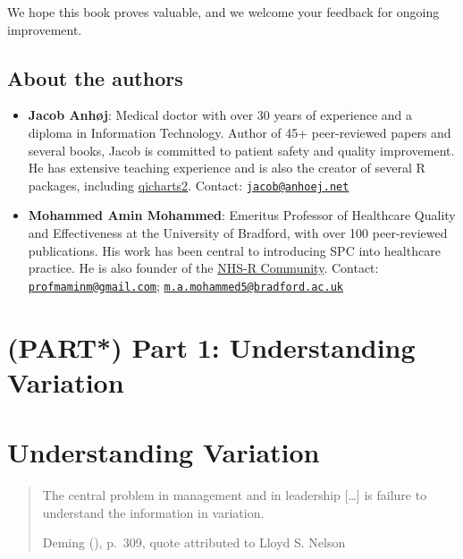 \documentclass[
]{book}
\begin{document}
We hope this book proves valuable, and we welcome your feedback for
ongoing improvement.

\section*{About the authors}\label{about-the-authors}

\begin{itemize}
\item
  \textbf{Jacob Anhøj}: Medical doctor with over 30 years of experience
  and a diploma in Information Technology. Author of 45+ peer-reviewed
  papers and several books, Jacob is committed to patient safety and
  quality improvement. He has extensive teaching experience and is also
  the creator of several R packages, including
  \href{https://anhoej.github.io/qicharts2/}{qicharts2}. Contact:
  \href{mailto:jacob@anhoej.net}{\nolinkurl{jacob@anhoej.net}}
\item
  \textbf{Mohammed Amin Mohammed}: Emeritus Professor of Healthcare
  Quality and Effectiveness at the University of Bradford, with over 100
  peer-reviewed publications. His work has been central to introducing
  SPC into healthcare practice. He is also founder of the
  \href{https://nhsrcommunity.com/}{NHS-R Community}. Contact:
  \href{mailto:profmaminm@gmail.com}{\nolinkurl{profmaminm@gmail.com}};
  \href{mailto:m.a.mohammed5@bradford.ac.uk}{\nolinkurl{m.a.mohammed5@bradford.ac.uk}}
\end{itemize}

\chapter*{(PART*) Part 1: Understanding
Variation}\label{part-part-1-understanding-variation}

\chapter{Understanding Variation}\label{variation}

\begin{quote}
The central problem in management and in leadership {[}\ldots{]} is
failure to understand the information in variation.

Deming (), p.~309, quote attributed to
Lloyd S. Nelson
\end{quote}
\end{document}
